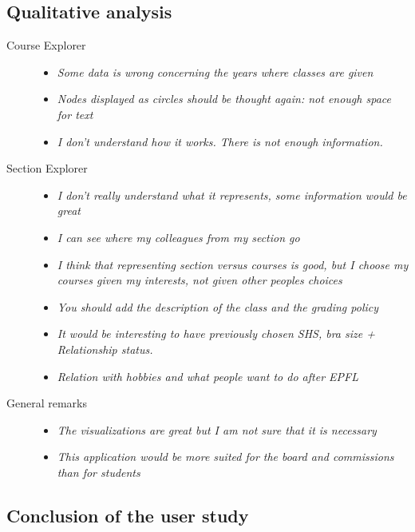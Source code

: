 \subsection{Qualitative analysis}

\begin{description}
\item[Course Explorer] \quad 
	\begin{itemize}
	\item \emph{Some data is wrong concerning the years where classes are given}
	\item \emph{Nodes displayed as circles should be thought again: not enough space for text}
	\item \emph{I don't understand how it works. There is not enough information.}
	\end{itemize}
\item[Section Explorer] \quad 
	\begin{itemize}
	\item \emph{I don't really understand what it represents, some information would be great}
	\item \emph{I can see where my colleagues from my section go}
	\item \emph{I think that representing section versus courses is good, but I choose my courses given my interests, not given other peoples choices}
	\item \emph{You should add the description of the class and the grading policy}
	\item \emph{It would be interesting to have previously chosen SHS, bra size + Relationship status.}
	\item \emph{Relation with hobbies and what people want to do after EPFL}
	\end{itemize}
\item[General remarks] \quad
	\begin{itemize}
	\item \emph{The visualizations are great but I am not sure that it is necessary}
	\item \emph{This application would be more suited for the board and commissions than for students}
	\end{itemize}
\end{description}

\subsection{Conclusion of the user study}

